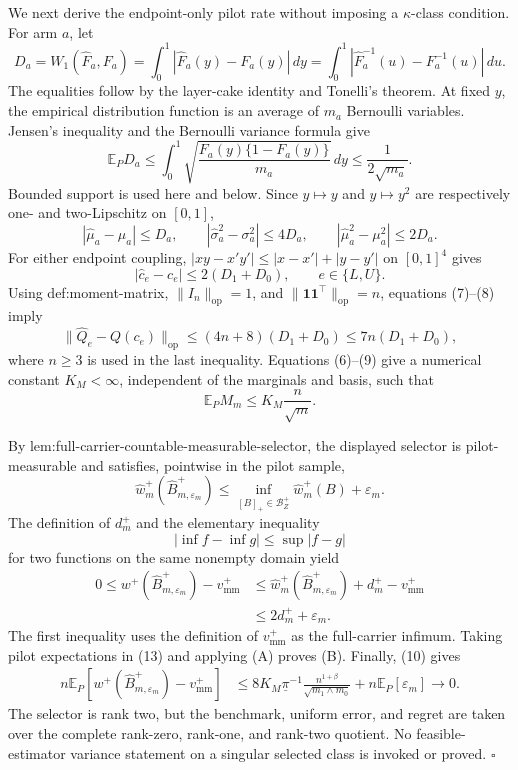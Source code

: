 We next derive the endpoint-only pilot rate without imposing a \(\kappa\)-class condition.  For arm \(a\), let
\[
 D_a=W_1(\widehat F_a,F_a)
 =\int_0^1|\widehat F_a(y)-F_a(y)|\,dy
 =\int_0^1|\widehat F_a^{-1}(u)-F_a^{-1}(u)|\,du.
\tag{5}
\]
The equalities follow by the layer-cake identity and Tonelli's theorem.  At fixed \(y\), the empirical distribution function is an average of \(m_a\) Bernoulli variables.  Jensen's inequality and the Bernoulli variance formula give
\[
 \mathbb E_PD_a
 \le\int_0^1
 \sqrt{\frac{F_a(y)\{1-F_a(y)\}}{m_a}}\,dy
 \le\frac1{2\sqrt{m_a}}.
\tag{6}
\]
Bounded support is used here and below.  Since \(y\mapsto y\) and \(y\mapsto y^2\) are respectively one- and two-Lipschitz on \([0,1]\),
\[
 |\widehat\mu_a-\mu_a|\le D_a,
 \qquad
 |\widehat\sigma_a^2-\sigma_a^2|\le4D_a,
 \qquad
 |\widehat\mu_a^2-\mu_a^2|\le2D_a.
\tag{7}
\]
For either endpoint coupling, \(|xy-x'y'|\le|x-x'|+|y-y'|\) on \([0,1]^4\) gives
\[
 |\widehat c_e-c_e|\le2(D_1+D_0),
 \qquad e\in\{L,U\}.
\tag{8}
\]
Using def:moment-matrix, \(\lVert I_n\rVert_{\mathrm{op}}=1\), and
\(\lVert\mathbf1\mathbf1^{\top}\rVert_{\mathrm{op}}=n\), equations (7)--(8) imply
\[
 \lVert\widehat Q_e-Q(c_e)\rVert_{\mathrm{op}}
 \le(4n+8)(D_1+D_0)
 \le7n(D_1+D_0),
\tag{9}
\]
where \(n\ge3\) is used in the last inequality.  Equations (6)--(9) give a numerical constant \(K_M<\infty\), independent of the marginals and basis, such that
\[
 \mathbb E_PM_m\le K_M\frac{n}{\sqrt m}.
\tag{10}
\]

By lem:full-carrier-countable-measurable-selector, the displayed selector is pilot-measurable and satisfies, pointwise in the pilot sample,
\[
 \widehat w_m^+(\widehat B_{m,\varepsilon_m}^+)
 \le \inf_{[B]_+\in\mathcal B_Z^+}\widehat w_m^+(B)+\varepsilon_m.
\tag{11}
\]
The definition of \(d_m^+\) and the elementary inequality
\[
 \left|\inf f-\inf g\right|\le\sup|f-g|
\tag{12}
\]
for two functions on the same nonempty domain yield
\[
\begin{aligned}
0\le w^+(\widehat B_{m,\varepsilon_m}^+)-v_{\mathrm{mm}}^+
&\le \widehat w_m^+(\widehat B_{m,\varepsilon_m}^+)
 +d_m^+-v_{\mathrm{mm}}^+\\
&\le2d_m^++\varepsilon_m.
\end{aligned}
\tag{13}
\]
The first inequality uses the definition of \(v_{\mathrm{mm}}^+\) as the full-carrier infimum.  Taking pilot expectations in (13) and applying (A) proves (B).  Finally, (10) gives
\[
\begin{aligned}
n\mathbb E_P\!\left[
w^+(\widehat B_{m,\varepsilon_m}^+)-v_{\mathrm{mm}}^+
\right]
&\le8K_M\underline\pi^{-1}
\frac{n^{1+\beta}}{\sqrt{m_1\wedge m_0}}
+n\mathbb E_P[\varepsilon_m]
\longrightarrow0.
\end{aligned}
\]
The selector is rank two, but the benchmark, uniform error, and regret are taken over the complete rank-zero, rank-one, and rank-two quotient.  No feasible-estimator variance statement on a singular selected class is invoked or proved. \(\square\)